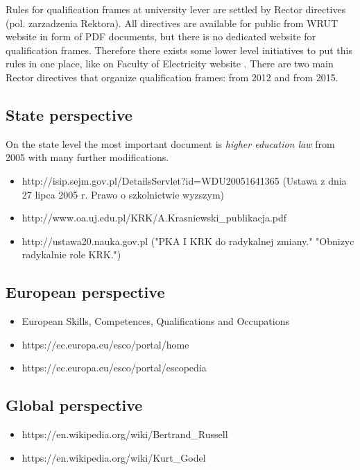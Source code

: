 \documentclass{report}
\begin{document}
Rules for qualification frames at university lever are settled by Rector
directives (pol. zarzadzenia Rektora). All directives are available for public
from WRUT website in form of PDF documents, but there is no dedicated website
for qualification frames. Therefore there exists some lower level initiatives
to put this rules in one place, like on Faculty of Electricity website
\cite{web:weny-krk}. There are two main Rector directives that organize
qualification frames: from 2012\cite{web:2012-krk} and from
2015\cite{web:2015-krk}.

\subsection{State perspective}
On the state level the most important document is \textit{higher education
law} from 2005 with many further modifications.
\begin{itemize}
  \item http://isip.sejm.gov.pl/DetailsServlet?id=WDU20051641365
    (Ustawa z dnia 27 lipca 2005 r. Prawo o szkolnictwie wyzszym)
  \item http://www.oa.uj.edu.pl/KRK/A.Krasniewski\_publikacja.pdf
  \item http://ustawa20.nauka.gov.pl
    ("PKA I KRK do radykalnej zmiany."
    "Obnizyc radykalnie role KRK.")
\end{itemize}

\subsection{European perspective}
\begin{itemize}
  \item European Skills, Competences, Qualifications and Occupations
  \item https://ec.europa.eu/esco/portal/home
  \item https://ec.europa.eu/esco/portal/escopedia
\end{itemize}

\subsection{Global perspective}
\begin{itemize}
  \item https://en.wikipedia.org/wiki/Bertrand\_Russell
  \item https://en.wikipedia.org/wiki/Kurt\_Godel
\end{itemize}
\end{document}

